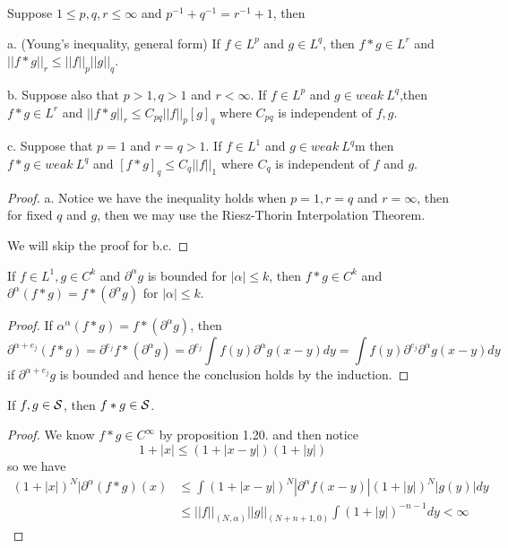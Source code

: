 \begin{proposition}
    Suppose $1\leq p,q,r \leq \infty$ and $p^{-1}+q^{-1} = r^{-1}+1$, then\par
    a. (Young's inequality, general form) If $f\in L^p$ and $g\in L^q$, then $f*g \in L^r$ and $||f*g||_r \leq ||f||_p||g||_q$.\par
    b. Suppose also that $p>1,q>1$ and $r<\infty$. If $f\in L^p$ and $g\in weak\ L^q$,then $f*g \in L^r$ and $||f*g||_r \leq C_{pq}||f||_p[g]_q$ where $C_{pq}$ is independent of $f,g$.\par
    c. Suppose that $p=1$ and $r= q >1$. If $f\in L^1$ and $g\in weak\ L^q$m then $f*g\in weak\ L^q$ and $[f*g]_q \leq C_q||f||_1$ where $C_q$ is independent of $f$ and $g$.  
\end{proposition}
\begin{proof}\par
    a. Notice we have the inequality holds when $p=1,r=q$ and $r=\infty$, then for fixed $q$ and $g$, then we may use the Riesz-Thorin Interpolation Theorem.\par
    We will skip the proof for b.c.
\end{proof}

\begin{proposition}
    If $f\in L^1,g\in C^k$ and $\partial^{\alpha} g$ is bounded for $|\alpha|\leq k$, then $f*g\in C^k$ and $\partial^{\alpha}(f*g) = f*(\partial^{\alpha} g)$ for $|\alpha| \leq k$.
\end{proposition}
\begin{proof}\par
    If $\alpha^{\alpha}(f*g) = f*(\partial^{\alpha} g)$, then
    \[
    \partial^{\alpha+e_j}(f*g) = \partial^{e_j}f*(\partial^{\alpha} g) = \partial^{e_j}\int f(y)\partial^{\alpha}g(x-y)dy = \int f(y)\partial^{e_j}\partial^{\alpha}g(x-y)dy 
    \]
    if $\partial^{\alpha+e_j} g$ is bounded and hence the conclusion holds by the induction.
\end{proof}

\begin{proposition}
    If $f,g\in \mathcal{S}$, then $f*g \in \mathcal{S}$.
\end{proposition}
\begin{proof}
    We know $f*g\in C^{\infty}$ by proposition 1.20. and then notice
    \[1+|x| \leq (1+|x-y|)(1+|y|)\]
    so we have
    \[
    \begin{aligned}
    (1+|x|)^N|\partial^{\alpha}(f*g)(x) &\leq \int (1+|x-y|)^N|\partial^{\alpha}f(x-y)|(1+|y|)^N|g(y)|dy \\ &\leq||f||_{(N,\alpha)}||g||_{(N+n+1,0)}\int(1+|y|)^{-n-1}dy < \infty
    \end{aligned}
    \]
\end{proof}

